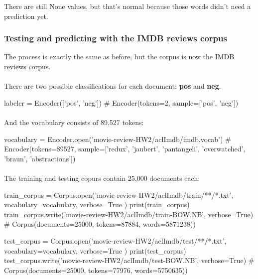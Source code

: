 \documentclass{article}
\begin{document}
There are still None values, but that's normal because those words didn't need a prediction yet.

\clearpage

\subsubsection*{Testing and predicting with the IMDB reviews corpus}

The process is exactly the same as before, but the corpus is now the IMDB reviews corpus.

\paragraph{} There are two possible classifications for each document: \textbf{pos} and \textbf{neg}.
\begin{python}
labeler = Encoder(['pos', 'neg'])
# Encoder(tokens=2, sample=['pos', 'neg'])
\end{python}

\paragraph{} And the vocabulary consists of 89,527 tokens:

\begin{python}
vocabulary = Encoder.open('movie-review-HW2/aclImdb/imdb.vocab')
# Encoder(tokens=89527, sample=['redux', 'jaubert', 'pantangeli', 'overwatched', 'braun', 'abstractions'])
\end{python}

\paragraph{} The training and testing copurs contain 25,000 documents each:

\begin{python}
    train_corpus = Corpus.open('movie-review-HW2/aclImdb/train/**/*.txt',
    vocabulary=vocabulary,
    verbose=True
)
print(train_corpus)
train_corpus.write('movie-review-HW2/aclImdb/train-BOW.NB', verbose=True)
# Corpus(documents=25000, tokens=87884, words=5871238))
\end{python}

\begin{python}
    test_corpus = Corpus.open('movie-review-HW2/aclImdb/test/**/*.txt',
    vocabulary=vocabulary,
    verbose=True
)
print(test_corpus)
test_corpus.write('movie-review-HW2/aclImdb/test-BOW.NB', verbose=True)
# Corpus(documents=25000, tokens=77976, words=5750635))
\end{python}
\end{document}
